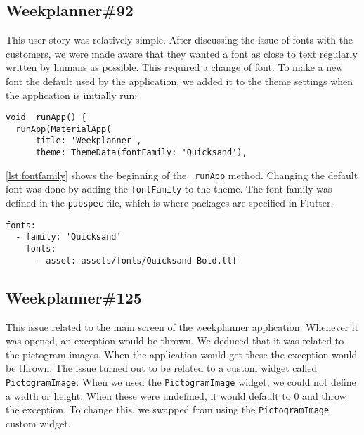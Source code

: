 \subsection{Weekplanner\#92}
This user story was relatively simple.
After discussing the issue of fonts with the customers, we were made aware that they wanted a font as close to text regularly written by humans as possible.
This required a change of font.
To make a new font the default used by the application, we added it to the theme settings when the application is initially run:

\begin{lstlisting}[caption={An excerpt of the run method},label={lst:fontfamily},language={[Sharp]C}]
  void _runApp() {
  runApp(MaterialApp(
      title: 'Weekplanner',
      theme: ThemeData(fontFamily: 'Quicksand'),
\end{lstlisting}
\autoref{lst:fontfamily} shows the beginning of the \texttt{\_runApp} method.
Changing the default font was done by adding the \texttt{fontFamily} to the theme.
The font family was defined in the \texttt{pubspec} file, which is where packages are specified in Flutter.
\begin{lstlisting}[caption={An excerpt of the pubspec file. Multiple assets are in the file for different styles, such as regular font.},label={lst:fontpubspec},language={[Sharp]C}]
  fonts:
  - family: 'Quicksand'
    fonts:
      - asset: assets/fonts/Quicksand-Bold.ttf
\end{lstlisting}
\subsection{Weekplanner\#125}
This issue related to the main screen of the weekplanner application.
Whenever it was opened, an exception would be thrown.
We deduced that it was related to the pictogram images. 
When the application would get these the exception would be thrown.
The issue turned out to be related to a custom widget called \texttt{PictogramImage}.
When we used the \texttt{PictogramImage} widget, we could not define a width or height.
When these were undefined, it would default to 0 and throw the exception.
To change this, we swapped from using the \texttt{PictogramImage} custom widget.

